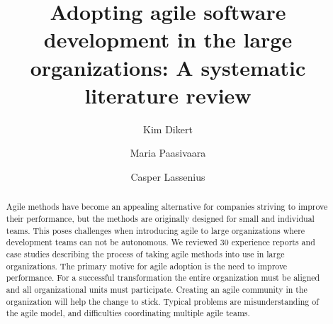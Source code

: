 \documentclass[preprint,authoryear,12pt]{elsarticle}
\begin{document}

\begin{frontmatter}



\title{Adopting agile software development in the large organizations:
       A systematic literature review}

\author{Kim Dikert}

\author{Maria Paasivaara}

\author{Casper Lassenius}

\address{Aalto University, School of Science, Department of Computer Science and Engineering}



\begin{abstract}

Agile methods have become an appealing alternative for companies striving to
improve their performance, but the methods are originally designed for small and
individual teams. This poses challenges when introducing agile to large
organizations where development teams can not be autonomous. We reviewed 30
experience reports and case studies describing the process of taking agile
methods into use in large organizations. The primary motive for agile adoption
is the need to improve performance. For a successful transformation the entire
organization must be aligned and all organizational units must participate.
Creating an agile community in the organization will help the change to stick.
Typical problems are misunderstanding of the agile model, and difficulties
coordinating multiple agile teams.


\end{abstract}
\end{frontmatter}
\end{document}
